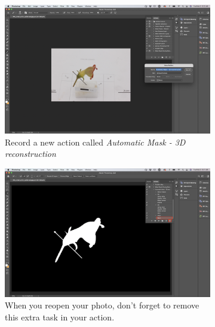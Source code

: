 \documentclass[10pt,letter,english]{article}
\begin{document}
\begin{enumerate}
\begin{figure}[H]
\centering
\begin{subfigure}[t]{.45\linewidth} %
  \centering
  \includegraphics[width=1\linewidth]{Figures/mask_1.png}
  \caption{Record a new action called \textit{Automatic Mask - 3D reconstruction}}
  \label{}
\end{subfigure} \hspace{10pt}%
\begin{subfigure}[t]{.45\linewidth}
  \centering
  \includegraphics[width=1\linewidth]{Figures/mask_2.png}
  \caption{When you reopen your photo, don't forget to remove this extra task in your action.}
  \label{}
\end{subfigure}
\vspace{10pt}
\begin{subfigure}[t]{.45\linewidth}
  \centering

\end{subfigure}
\end{figure}
\end{enumerate}
\end{document}
